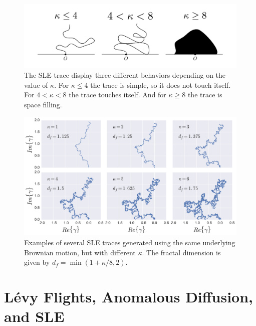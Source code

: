 \begin{figure}
\begin{center}
    \includegraphics[width=\textwidth]{chapters/ch4-sle/figs/kappa}
\end{center}
\caption{The SLE trace display three different behaviors depending on the value
    of $\kappa$. For $\kappa\leq4$ the trace is simple, so it does not touch
    itself. For $4<\kappa<8$ the trace touches itself. And for $\kappa\geq8$
    the trace is space filling.}
\label{fig:kappa}
\end{figure}

\begin{figure}
\begin{center}
    \includegraphics[width=\textwidth]{chapters/ch4-sle/figs/slefracdim}
\end{center}
\caption{Examples of several SLE traces generated using the same underlying
    Brownian motion, but with different $\kappa$. The fractal dimension is
    given by $d_f=\min(1+\kappa/8, 2)$.}
\label{fig:slefracdim}
\end{figure}


\section{Lévy Flights, Anomalous Diffusion, and SLE}

